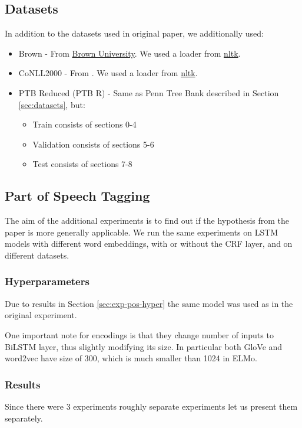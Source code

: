 \documentclass[11pt,a4paper]{article}
\begin{document}
    \subsection{Datasets}
    In addition to the datasets used in original paper, we additionally used:
    \begin{itemize}
        \item Brown - From \href{http://korpus.uib.no/icame/brown/bcm.html}{Brown University}. We used a loader from \href{https://www.nltk.org/}{nltk}.
        \item CoNLL2000 - From \cite{conll2000}. We used a loader from \href{https://www.nltk.org/}{nltk}.
        \item PTB Reduced (PTB R) - Same as Penn Tree Bank described in Section \ref{sec:datasets}, but:
        \begin{itemize}
            \item Train consists of sections 0-4
            \item Validation consists of sections 5-6
            \item Test consists of sections 7-8
        \end{itemize}
    \end{itemize}

    \subsection{Part of Speech Tagging}
    The aim of the additional experiments is to find out if the hypothesis from the paper is more generally applicable. We run the same experiments on LSTM models with different word embeddings, with or without the CRF layer, and on different datasets.

    \subsubsection{Hyperparameters}
    Due to results in Section \ref{sec:exp-pos-hyper} the same model was used as in the original experiment.

    One important note for encodings is that they change number of inputs to BiLSTM layer, thus slightly modifying its size. In particular both GloVe and word2vec have size of 300, which is much smaller than 1024 in ELMo.

    \subsubsection{Results}
    Since there were 3 experiments roughly separate experiments let us present them separately.
\end{document}
